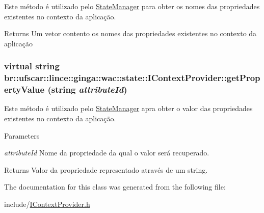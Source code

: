 Este método é utilizado pelo \hyperlink{classbr_1_1ufscar_1_1lince_1_1ginga_1_1wac_1_1state_1_1StateManager}{StateManager} para obter os nomes das propriedades existentes no contexto da aplicação. 

\begin{DoxyReturn}{Returns}
Um vetor contento os nomes das propriedades existentes no contexto da aplicação 
\end{DoxyReturn}
\hypertarget{classbr_1_1ufscar_1_1lince_1_1ginga_1_1wac_1_1state_1_1IContextProvider_a0777035084d9b444f13b85b71cda6927}{
\subsubsection[{getPropertyValue}]{\setlength{\rightskip}{0pt plus 5cm}virtual string br::ufscar::lince::ginga::wac::state::IContextProvider::getPropertyValue (string {\em attributeId})}}
\label{classbr_1_1ufscar_1_1lince_1_1ginga_1_1wac_1_1state_1_1IContextProvider_a0777035084d9b444f13b85b71cda6927}


Este método é utilizado pelo \hyperlink{classbr_1_1ufscar_1_1lince_1_1ginga_1_1wac_1_1state_1_1StateManager}{StateManager} apra obter o valor das propriedades existentes no contexto da aplicação. 


\begin{DoxyParams}{Parameters}
\item[{\em attributeId}]Nome da propriedade da qual o valor será recuperado. \end{DoxyParams}
\begin{DoxyReturn}{Returns}
Valor da propriedade representado através de um string. 
\end{DoxyReturn}


The documentation for this class was generated from the following file:\begin{DoxyCompactItemize}
\item 
include/\hyperlink{IContextProvider_8h}{IContextProvider.h}\end{DoxyCompactItemize}

